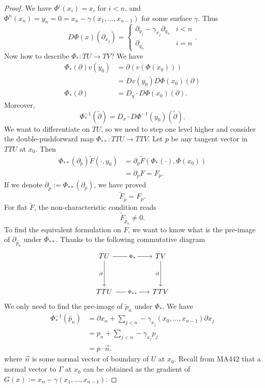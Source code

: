 \begin{enumerate}
\begin{proof}
We have $\Phi^i(x_i) = x_i$ for $i < n$, and $\Phi^n(x_n) = y_n = 0 = x_n - \gamma(x_1, \ldots, x_{n-1})$ for some surface $\gamma$. Thus 
\[
	D \Phi (x)(\partial_{x_j}) = 
	\begin{cases}
		\partial_{y_j} - \gamma_{x_j}\partial_{y_n} & i < n \\
		\partial_{y_n} &  i = n
	\end{cases}
.\] 
Now how to describe $\Phi_*: TU \to TV$? We have
\begin{align*}
	\Phi_*(\partial) v(y_0) &= \partial(v(\Phi(x_0))) \\
	&= D v (y_0) D \Phi(x_0) (\partial)\\
	\Phi_* (\partial)
	&= D_y \cdot D \Phi(x_0)(\partial)
.\end{align*}
Moreover,
\[
	\Phi_*^{-1}(\tilde{\partial})
	= D_x \cdot D\Phi^{-1}(y_0)(\tilde{\partial}) 
.\] 
	We want to differentiate on $TU$, so we need to step one level higher and consider the double-pushforward map $\Phi_{* *}: TTU \to TTV$. Let $p$ be any tangent vector in $TTU$ at $x_0$. Then
	\begin{align*}
		\Phi_{* *}(\partial_p) \tilde{F}(\cdot, y_0)
		&= \partial_p \tilde{F}\left( \Phi_*(\cdot), \Phi(x_0) \right)  \\
		&= \partial_p F = F_p
	.\end{align*}
	If we denote $\partial_{\tilde{p}} := \Phi_{* *} (\partial_p)$, we have proved
	\[
		\tilde{F} _{\tilde{p}} = F_p
	.\] 
	For flat $\tilde{F}$, the non-characteristic condition reads
	 \[
		 \tilde{F}_{\tilde{p_n}} \neq 0 
	.\] 
	To find the equivalent formulation on $F$, we want to know what is the pre-image of  $\partial_{\tilde{p_n}}$ under  $\Phi_{* *}$. Thanks to the following commutative diagram
\[\begin{tikzcd}
	TU && TV \\
	\\
	TTU && TTV
	\arrow["\partial"', from=1-1, to=3-1]
	\arrow["\partial"', from=1-3, to=3-3]
	\arrow["{\Phi_*}"{description}, from=1-1, to=1-3]
	\arrow["{\Phi_{* *}}"{description}, from=3-1, to=3-3]
\end{tikzcd}\]
We only need to find the pre-image of $\tilde{p}_n$ under  $\Phi_*$. 
We have
\begin{align*}
	\Phi_*^{-1}(\tilde{p_n})
	&= \partial x_n + \sum_{j < n} - \gamma_{x_j}(x_0, \ldots, x_{n-1}) \partial x_j \\
	&= p_n + \sum_{j < n} - \gamma_{x_j} p_j \\
	&= p \cdot \vec{n}
.\end{align*} 
where $\vec{n}$ is some normal vector of boundary of $U$ at $x_0$. Recall from MA442 that a normal vector to $\Gamma$ at $x_0$ can be obtained as the gradient of $G(x):= x_n - \gamma(x_1, \ldots, x_{n-1})$.


\end{proof}
\end{enumerate}
